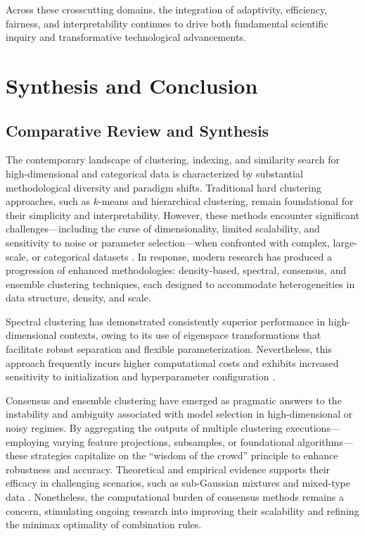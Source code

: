 \documentclass[sigconf]{acmart}
\begin{document}
Across these crosscutting domains, the integration of adaptivity, efficiency, fairness, and interpretability continues to drive both fundamental scientific inquiry and transformative technological advancements.

\section{Synthesis and Conclusion}

\subsection{Comparative Review and Synthesis}

The contemporary landscape of clustering, indexing, and similarity search for high-dimensional and categorical data is characterized by substantial methodological diversity and paradigm shifts. Traditional hard clustering approaches, such as $k$-means and hierarchical clustering, remain foundational for their simplicity and interpretability. However, these methods encounter significant challenges—including the curse of dimensionality, limited scalability, and sensitivity to noise or parameter selection—when confronted with complex, large-scale, or categorical datasets \cite{ref20,ref29,ref80}. In response, modern research has produced a progression of enhanced methodologies: density-based, spectral, consensus, and ensemble clustering techniques, each designed to accommodate heterogeneities in data structure, density, and scale.

Spectral clustering has demonstrated consistently superior performance in high-dimensional contexts, owing to its use of eigenspace transformations that facilitate robust separation and flexible parameterization. Nevertheless, this approach frequently incurs higher computational costs and exhibits increased sensitivity to initialization and hyperparameter configuration \cite{ref81,ref14,ref19}.

Consensus and ensemble clustering have emerged as pragmatic answers to the instability and ambiguity associated with model selection in high-dimensional or noisy regimes. By aggregating the outputs of multiple clustering executions—employing varying feature projections, subsamples, or foundational algorithms—these strategies capitalize on the ``wisdom of the crowd'' principle to enhance robustness and accuracy. Theoretical and empirical evidence supports their efficacy in challenging scenarios, such as sub-Gaussian mixtures and mixed-type data \cite{ref20,ref39,ref30,ref76,ref111}. Nonetheless, the computational burden of consensus methods remains a concern, stimulating ongoing research into improving their scalability and refining the minimax optimality of combination rules.
\end{document}
